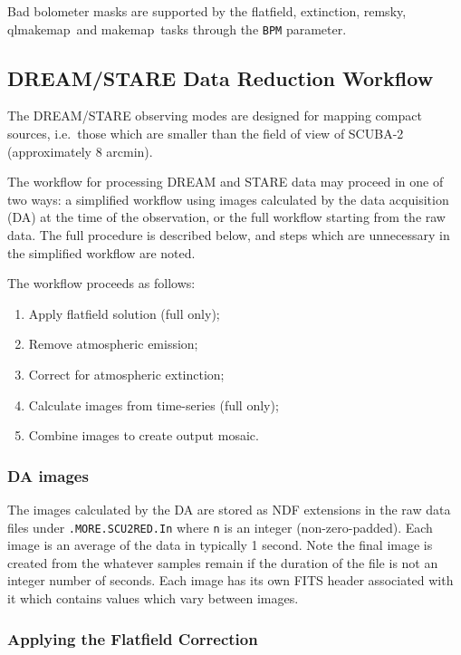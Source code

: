 \documentclass[twoside,11pt]{article}
\newcommand{\xref}[3]{#1}
\newcommand{\xlabel}[1]{}
\renewcommand{\_}{\texttt{\symbol{95}}}
\newcommand{\task}[1]{\textsf{#1}}
\newcommand{\qlmakemap}{\xref{\task{qlmakemap}}{sun258}{QLMAKEMAP}}
\newcommand{\extinction}{\xref{\task{extinction}}{sun258}{EXTINCTION}}
\newcommand{\flatfield}{\xref{\task{flatfield}}{sun258}{FLATFIELD}}
\newcommand{\makemap}{\xref{\task{makemap}}{sun258}{MAKEMAP}}
\newcommand{\remsky}{\xref{\task{remsky}}{sun258}{REMSKY}}
\begin{document}
Bad bolometer masks are supported by the \flatfield, \extinction,
\remsky, \qlmakemap\ and \makemap\ tasks through the \texttt{BPM}
parameter.

\subsection{\xlabel{dsworkflow}DREAM/STARE Data Reduction Workflow\label{se:dsworkflow}}

The DREAM/STARE observing modes are designed for mapping compact
sources, i.e.\ those which are smaller than the field of view of
SCUBA-2 (approximately 8 arcmin).

The workflow for processing DREAM and STARE data may proceed in one of
two ways: a simplified workflow using images calculated by the data
acquisition (DA) at the time of the observation, or the full workflow
starting from the raw data. The full procedure is described below, and
steps which are unnecessary in the simplified workflow are noted.

The workflow proceeds as follows:
\begin{enumerate}
\item Apply flatfield solution (full only);
\item Remove atmospheric emission;
\item Correct for atmospheric extinction;
\item Calculate images from time-series (full only);
\item Combine images to create output mosaic.
\end{enumerate}

\subsubsection{DA images}

The images calculated by the DA are stored as NDF extensions in the
raw data files under \texttt{.MORE.SCU2RED.In} where \texttt{n} is an
integer (non-zero-padded). Each image is an average of the data in
typically 1 second. Note the final image is created from the whatever
samples remain if the duration of the file is not an integer number of
seconds. Each image has its own FITS header associated with it which
contains values which vary between images.

\subsubsection{\xlabel{flatfield}Applying the Flatfield Correction\label{se:flatfield}}
\end{document}
